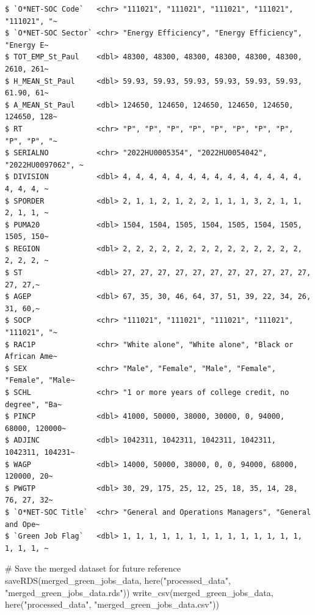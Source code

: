 \documentclass[
  letterpaper,
  DIV=11,
  numbers=noendperiod]{scrartcl}
\newenvironment{Shaded}{\begin{snugshade}}{\end{snugshade}}
\newcommand{\CommentTok}[1]{\textcolor[rgb]{0.37,0.37,0.37}{#1}}
\newcommand{\FunctionTok}[1]{\textcolor[rgb]{0.28,0.35,0.67}{#1}}
\newcommand{\NormalTok}[1]{\textcolor[rgb]{0.00,0.23,0.31}{#1}}
\newcommand{\StringTok}[1]{\textcolor[rgb]{0.13,0.47,0.30}{#1}}
\begin{document}
\begin{verbatim}
$ `O*NET-SOC Code`   <chr> "111021", "111021", "111021", "111021", "111021", "~
$ `O*NET-SOC Sector` <chr> "Energy Efficiency", "Energy Efficiency", "Energy E~
$ TOT_EMP_St_Paul    <dbl> 48300, 48300, 48300, 48300, 48300, 48300, 2610, 261~
$ H_MEAN_St_Paul     <dbl> 59.93, 59.93, 59.93, 59.93, 59.93, 59.93, 61.90, 61~
$ A_MEAN_St_Paul     <dbl> 124650, 124650, 124650, 124650, 124650, 124650, 128~
$ RT                 <chr> "P", "P", "P", "P", "P", "P", "P", "P", "P", "P", "~
$ SERIALNO           <chr> "2022HU0005354", "2022HU0054042", "2022HU0097062", ~
$ DIVISION           <dbl> 4, 4, 4, 4, 4, 4, 4, 4, 4, 4, 4, 4, 4, 4, 4, 4, 4, ~
$ SPORDER            <dbl> 2, 1, 1, 2, 1, 2, 2, 1, 1, 1, 3, 2, 1, 1, 2, 1, 1, ~
$ PUMA20             <dbl> 1504, 1504, 1505, 1504, 1505, 1504, 1505, 1505, 150~
$ REGION             <dbl> 2, 2, 2, 2, 2, 2, 2, 2, 2, 2, 2, 2, 2, 2, 2, 2, 2, ~
$ ST                 <dbl> 27, 27, 27, 27, 27, 27, 27, 27, 27, 27, 27, 27, 27,~
$ AGEP               <dbl> 67, 35, 30, 46, 64, 37, 51, 39, 22, 34, 26, 31, 60,~
$ SOCP               <chr> "111021", "111021", "111021", "111021", "111021", "~
$ RAC1P              <chr> "White alone", "White alone", "Black or African Ame~
$ SEX                <chr> "Male", "Female", "Male", "Female", "Female", "Male~
$ SCHL               <chr> "1 or more years of college credit, no degree", "Ba~
$ PINCP              <dbl> 41000, 50000, 38000, 30000, 0, 94000, 68000, 120000~
$ ADJINC             <dbl> 1042311, 1042311, 1042311, 1042311, 1042311, 104231~
$ WAGP               <dbl> 14000, 50000, 38000, 0, 0, 94000, 68000, 120000, 20~
$ PWGTP              <dbl> 30, 29, 175, 25, 12, 25, 18, 35, 14, 28, 76, 27, 32~
$ `O*NET-SOC Title`  <chr> "General and Operations Managers", "General and Ope~
$ `Green Job Flag`   <dbl> 1, 1, 1, 1, 1, 1, 1, 1, 1, 1, 1, 1, 1, 1, 1, 1, 1, ~
\end{verbatim}

\begin{Shaded}
\begin{Highlighting}[]
\CommentTok{\# Save the merged dataset for future reference}
\FunctionTok{saveRDS}\NormalTok{(merged\_green\_jobs\_data, }\FunctionTok{here}\NormalTok{(}\StringTok{"processed\_data"}\NormalTok{, }\StringTok{"merged\_green\_jobs\_data.rds"}\NormalTok{))}
\FunctionTok{write\_csv}\NormalTok{(merged\_green\_jobs\_data, }\FunctionTok{here}\NormalTok{(}\StringTok{"processed\_data"}\NormalTok{, }\StringTok{"merged\_green\_jobs\_data.csv"}\NormalTok{))}
\end{Highlighting}
\end{Shaded}
\end{document}
